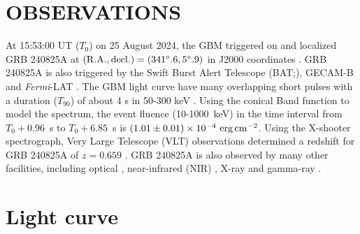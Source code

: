 \documentclass[twocolumn]{aastex631}
\begin{document}
\section{OBSERVATIONS} 
\label{sec:observation}
At 15:53:00 UT ($T_0$) on 25 August 2024, the GBM  triggered on and localized  GRB 240825A  at $\rm (R.A., decl.)= (341^\circ.6, 5^\circ.9)$ in J2000 coordinates \citep{2024GCN.37273....1F}. 
GRB 240825A is also triggered by the Swift Burst Alert Telescope (BAT;\cite{2024GCN.37274....1G}),  GECAM-B \citep{2024GCN.37315....1W} and {\em Fermi}-LAT \citep{2024GCN.37288....1D,2024GCN.37301....1S}.
The GBM light curve have many overlapping short pulses with a 
duration ($T_{90}$) of about 4 s in 50-300 keV \citep{2024GCN.37301....1S}. Using the conical Band function to model the spectrum, the event fluence (10-1000~keV) in the time interval from $T_0+0.96$~s to $T_0+6.85$~s  is
$(1.01 \pm 0.01)\times 10^{-4}~{\rm erg \, cm^{-2}}$\citep{2024GCN.37301....1S}. 
Using the X-shooter spectrograph, Very Large Telescope (VLT) observations determined a redshift for GRB 240825A of $z = 0.659$ \citep{2024GCN.37293....1M}.
GRB 240825A is also observed by many other facilities,  including optical \citep{2024GCN.37275....1J,2024GCN.37276....1D,2024GCN.37277....1O,2024GCN.37278....1Z,2024GCN.37279....1L,2024GCN.37280....1L,2024GCN.37292....1S,2024arXiv240914716C}, near-infrared (NIR) \citep{2024GCN.37295....1B,2024GCN.37303....1G}, X-ray \citep{2024GCN.37290....1E} and gamma-ray \citep{2024GCN.37302....1F}.


\section{Light curve} 
\label{sec:lc}
\end{document}
